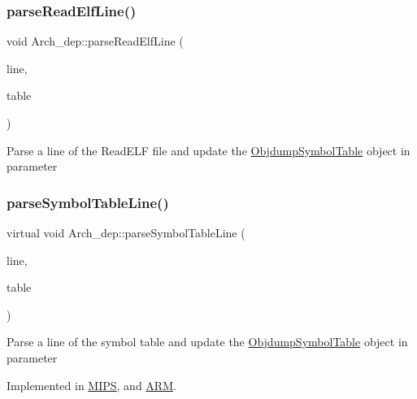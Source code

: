 \subsubsection{\texorpdfstring{parse\+Read\+Elf\+Line()}{parseReadElfLine()}}
{\footnotesize\ttfamily void Arch\+\_\+dep\+::parse\+Read\+Elf\+Line (\begin{DoxyParamCaption}\item[{const string \&}]{line,  }\item[{\hyperlink{classObjdumpSymbolTable}{Objdump\+Symbol\+Table} \&}]{table }\end{DoxyParamCaption})}

Parse a line of the Read\+E\+LF file and update the \hyperlink{classObjdumpSymbolTable}{Objdump\+Symbol\+Table} object in parameter \mbox{\label{classArch__dep_a5d50b1a54bf2afc034b813d1008c9f8e}} 
\subsubsection{\texorpdfstring{parse\+Symbol\+Table\+Line()}{parseSymbolTableLine()}}
{\footnotesize\ttfamily virtual void Arch\+\_\+dep\+::parse\+Symbol\+Table\+Line (\begin{DoxyParamCaption}\item[{const string \&}]{line,  }\item[{\hyperlink{classObjdumpSymbolTable}{Objdump\+Symbol\+Table} \&}]{table }\end{DoxyParamCaption})\hspace{0.3cm}{\ttfamily [pure virtual]}}

Parse a line of the symbol table and update the \hyperlink{classObjdumpSymbolTable}{Objdump\+Symbol\+Table} object in parameter 

Implemented in \hyperlink{classMIPS_ae63e651cee1687716908f3c9f66d9f3f}{M\+I\+PS}, and \hyperlink{classARM_a894de997c1cde8f31a2e08e6a0c0487d}{A\+RM}.

\mbox{\label{classArch__dep_a9e6075dd5bc43a1522aa65f2d11dad06}} 
